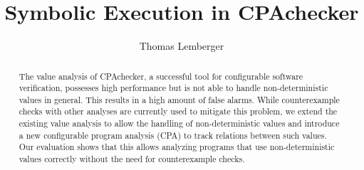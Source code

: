 \documentclass{acm_proc_article-sp}
\begin{document}
\newcommand{\valueAnalysisCPA}{ValueAnalysisCPA}
\newcommand{\constraintsCPA}{ConstraintsCPA}
\newcommand{\locationCPA}{LocationCPA}
\newcommand{\symbolicExecutionCPA}{SymbolicExecutionCPA}
\newcommand{\symbolicValueCPA}{SymbolicValueCPA}
\newcommand{\compositeCPA}{CompositeCPA}
\sloppy
\title{Symbolic Execution in CPAchecker}
\subtitle{}
\author{
  \alignauthor
  Thomas Lemberger
}
\maketitle

\begin{abstract}
  The value analysis of CPAchecker, a successful tool for configurable software verification, possesses high performance but is not able to handle non-deterministic values in general.
This results in a high amount of false alarms.
While counterexample checks with other analyses are currently used to mitigate this problem,
we extend the existing value analysis to allow the handling of non-deterministic values and introduce a new configurable program analysis (CPA) to track relations between such values.
Our evaluation shows that this allows analyzing programs that use non-deterministic values correctly without the need for counterexample checks.
\end{abstract}







\end{document}
